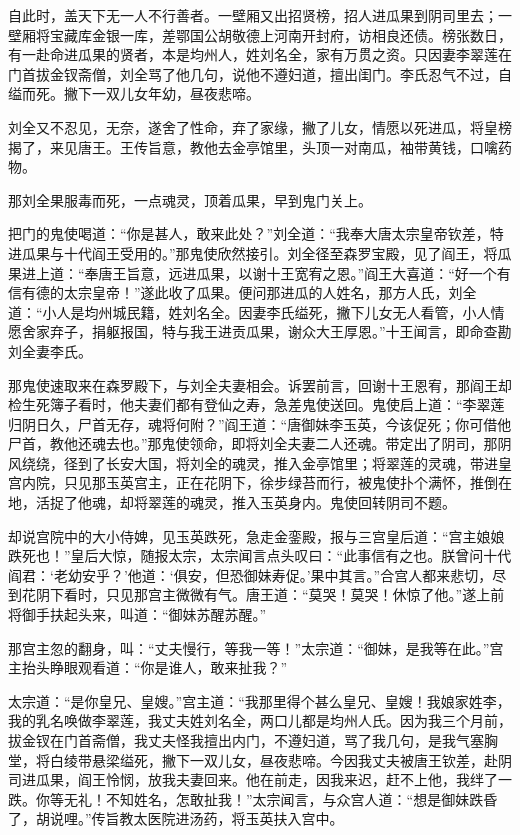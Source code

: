 \documentclass[12pt]{lsbook}
\begin{document}
自此时，盖天下无一人不行善者。一壁厢又出招贤榜，招人进瓜果到阴司里去；一壁厢将宝藏库金银一库，差鄂国公胡敬德上河南开封府，访相良还债。榜张数日，有一赴命进瓜果的贤者，本是均州人，姓刘名全，家有万贯之资。只因妻李翠莲在门首拔金钗斋僧，刘全骂了他几句，说他不遵妇道，擅出闺门。李氏忍气不过，自缢而死。撇下一双儿女年幼，昼夜悲啼。

刘全又不忍见，无奈，遂舍了性命，弃了家缘，撇了儿女，情愿以死进瓜，将皇榜揭了，来见唐王。王传旨意，教他去金亭馆里，头顶一对南瓜，袖带黄钱，口噙药物。

那刘全果服毒而死，一点魂灵，顶着瓜果，早到鬼门关上。

把门的鬼使喝道：“你是甚人，敢来此处？”刘全道：“我奉大唐太宗皇帝钦差，特进瓜果与十代阎王受用的。”那鬼使欣然接引。刘全径至森罗宝殿，见了阎王，将瓜果进上道：“奉唐王旨意，远进瓜果，以谢十王宽宥之恩。”阎王大喜道：“好一个有信有德的太宗皇帝！”遂此收了瓜果。便问那进瓜的人姓名，那方人氏，刘全道：“小人是均州城民籍，姓刘名全。因妻李氏缢死，撇下儿女无人看管，小人情愿舍家弃子，捐躯报国，特与我王进贡瓜果，谢众大王厚恩。”十王闻言，即命查勘刘全妻李氏。

那鬼使速取来在森罗殿下，与刘全夫妻相会。诉罢前言，回谢十王恩宥，那阎王却检生死簿子看时，他夫妻们都有登仙之寿，急差鬼使送回。鬼使启上道：“李翠莲归阴日久，尸首无存，魂将何附？”阎王道：“唐御妹李玉英，今该促死；你可借他尸首，教他还魂去也。”那鬼使领命，即将刘全夫妻二人还魂。带定出了阴司，那阴风绕绕，径到了长安大国，将刘全的魂灵，推入金亭馆里；将翠莲的灵魂，带进皇宫内院，只见那玉英宫主，正在花阴下，徐步绿苔而行，被鬼使扑个满怀，推倒在地，活捉了他魂，却将翠莲的魂灵，推入玉英身内。鬼使回转阴司不题。

却说宫院中的大小侍婢，见玉英跌死，急走金銮殿，报与三宫皇后道：“宫主娘娘跌死也！”皇后大惊，随报太宗，太宗闻言点头叹曰：“此事信有之也。朕曾问十代阎君：‘老幼安乎？’他道：‘俱安，但恐御妹寿促。’果中其言。”合宫人都来悲切，尽到花阴下看时，只见那宫主微微有气。唐王道：“莫哭！莫哭！休惊了他。”遂上前将御手扶起头来，叫道：“御妹苏醒苏醒。”

那宫主忽的翻身，叫：“丈夫慢行，等我一等！”太宗道：“御妹，是我等在此。”宫主抬头睁眼观看道：“你是谁人，敢来扯我？”

太宗道：“是你皇兄、皇嫂。”宫主道：“我那里得个甚么皇兄、皇嫂！我娘家姓李，我的乳名唤做李翠莲，我丈夫姓刘名全，两口儿都是均州人氏。因为我三个月前，拔金钗在门首斋僧，我丈夫怪我擅出内门，不遵妇道，骂了我几句，是我气塞胸堂，将白绫带悬梁缢死，撇下一双儿女，昼夜悲啼。今因我丈夫被唐王钦差，赴阴司进瓜果，阎王怜悯，放我夫妻回来。他在前走，因我来迟，赶不上他，我绊了一跌。你等无礼！不知姓名，怎敢扯我！”太宗闻言，与众宫人道：“想是御妹跌昏了，胡说哩。”传旨教太医院进汤药，将玉英扶入宫中。
\end{document}
